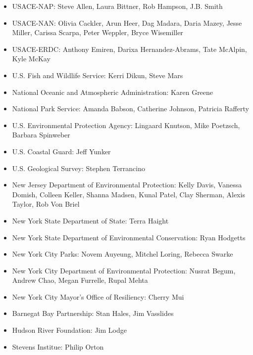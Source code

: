 \documentclass[
]{book}
\providecommand{\tightlist}{%
  \setlength{\itemsep}{0pt}\setlength{\parskip}{0pt}}
\begin{document}
\begin{itemize}
\tightlist
\item
  USACE-NAP: Steve Allen, Laura Bittner, Rob Hampson, J.B. Smith\\
\item
  USACE-NAN: Olivia Cackler, Arun Heer, Dag Madara, Daria Mazey, Jesse Miller, Carissa Scarpa, Peter Weppler, Bryce Wisemiller\\
\item
  USACE-ERDC: Anthony Emiren, Darixa Hernandez-Abrams, Tate McAlpin, Kyle McKay\\
\item
  U.S. Fish and Wildlife Service: Kerri Dikun, Steve Mars\\
\item
  National Oceanic and Atmospheric Administration: Karen Greene\\
\item
  National Park Service: Amanda Babson, Catherine Johnson, Patricia Rafferty\\
\item
  U.S. Environmental Protection Agency: Lingaard Knutson, Mike Poetzsch, Barbara Spinweber\\
\item
  U.S. Coastal Guard: Jeff Yunker\\
\item
  U.S. Geological Survey: Stephen Terrancino\\
\item
  New Jersey Department of Environmental Protection: Kelly Davis, Vanessa Domish, Colleen Keller, Shanna Madsen, Kunal Patel, Clay Sherman, Alexis Taylor, Rob Von Briel\\
\item
  New York State Department of State: Terra Haight\\
\item
  New York State Department of Environmental Conservation: Ryan Hodgetts
\item
  New York City Parks: Novem Auyeung, Mitchel Loring, Rebecca Swarke\\
\item
  New York City Department of Environmental Protection: Nusrat Begum, Andrew Chao, Megan Furrelle, Rupal Mehta\\
\item
  New York City Mayor's Office of Resiliency: Cherry Mui\\
\item
  Barnegat Bay Partnership: Stan Hales, Jim Vasslides\\
\item
  Hudson River Foundation: Jim Lodge\\
\item
  Stevens Institue: Philip Orton
\end{itemize}
\end{document}
